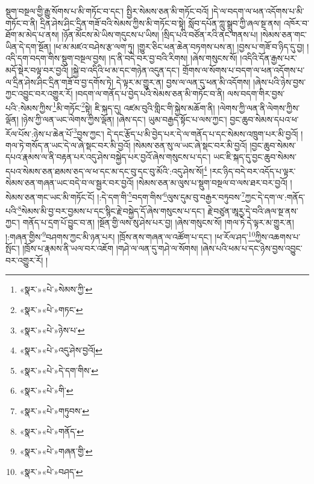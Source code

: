 སྡུག་བསྔལ་གྱི་རྒྱུ་སོགས་པ་མི་གཏོང་བ་དང་། སྤྱིར་སེམས་ཅན་མི་གཏོང་བའོ། །དེ་ལ་བདག་ལ་ཕན་འདོགས་པ་མི་གཏོང་བ་ནི། དྲིན་ཤེས་ཤིང་དྲིན་གཟོ་བའི་སེམས་ཀྱིས་མི་གཏོང་བ་སྟེ། སློབ་དཔོན་ཀླུ་སྒྲུབ་ཀྱི་ཞལ་སྔ་ནས། འཁོར་བ་ཐོག་མ་མེད་པ་ནས། །ཉོན་མོངས་མེ་ཡིས་གདུངས་པ་ཡིས། །སྲིད་པའི་བཙོན་རའི་ནང་གནས་པ། །སེམས་ཅན་གང་ཡིན་དེ་དག་སྔོན། །ཕ་མ་མཛའ་བཤེས་རྩ་ལག་ཏུ། །གྱུར་ཅིང་ཕན་ཆེན་བཏགས་པས་ན། །བྱས་པ་གཟོ་བ་ཉིད་དུ་བྱ། །འདི་དག་བདག་གིས་སྡུག་བསྔལ་བྱས། །ད་ནི་བདེ་བར་བྱ་བའི་རིགས། །ཞེས་གསུངས་སོ། །འདིའི་དོན་རྒྱས་པར་མདོ་སྡེར་བལྟ་བར་བྱའོ། །སྐྱེ་བ་འདིའི་ཕ་མ་དང་གཉེན་འདུན་དང་། གྲོགས་ལ་སོགས་པ་བདག་ལ་ཕན་འདོགས་པ་ལ་དྲིན་ཤེས་ཤིང་དྲིན་གཟོ་བ་བྱ་དགོས་ཏེ། དེ་ལྟར་མ་གྱུར་ན། བྱས་ལ་ལན་དུ་ཕན་མི་འདོགས། །ཞེས་པའི་ཉེས་བྱས་ཀྱང་འབྱུང་བར་འགྱུར་རོ། །བདག་ལ་གནོད་པ་བྱེད་པའི་སེམས་ཅན་མི་གཏོང་བ་ནི། ལས་བདག་གིར་བྱས་པའི་:སེམས་ཀྱིས་\footnote{«སྣར་»«པེ་»སེམས་ཀྱི་}མི་གཏོང་\footnote{«སྣར་»«པེ་»གཏང་}སྟེ། ཇི་སྐད་དུ། འཛམ་བུའི་གླིང་གི་སྐྱེས་མཆོག་ནི། །ལེགས་ཀྱི་ལན་ནི་ལེགས་ཀྱིས་ལྡོན། །ཉེས་ཀྱི་ལན་ཡང་ལེགས་ཀྱིས་ལྡོན། །ཞེས་དང་། ཡུམ་བརྒྱད་སྟོང་པ་ལས་ཀྱང་། བྱང་ཆུབ་སེམས་དཔའ་ཕ་རོལ་པོས་:ཉེས་པ་ཆེན་པོ་\footnote{«སྣར་»«པེ་»ཉེས་པ་}བྱས་ཀྱང་། དེ་དང་རྩོད་པ་མི་བྱེད་པར་དེ་ལ་གནོད་པ་དང་སེམས་འཁྲུག་པར་མི་བྱའོ། །གལ་ཏེ་གསོད་ན་ཡང་དེ་ལ་ཞེ་སྡང་བར་མི་བྱའོ། །སེམས་ཅན་སུ་ལ་ཡང་ཞེ་སྡང་བར་མི་བྱའོ། །བྱང་ཆུབ་སེམས་དཔའ་རྣམས་ལ་ནི་བརྟན་པར་འདུ་ཤེས་བསྐྱེད་པར་བྱའོ་ཞེས་གསུངས་པ་དང་། ཡང་ཇི་སྐད་དུ་བྱང་ཆུབ་སེམས་དཔའ་སེམས་ཅན་ཐམས་ཅད་ལ་ཕ་དང་མ་དང་བུ་དང་བུ་མོའི་:འདུ་ཤེས་སོ།\footnote{«སྣར་»«པེ་»འདུ་ཤེས་བྱའོ།} །རང་ཉིད་བདེ་བར་འདོད་པ་ལྟར་སེམས་ཅན་གཞན་ཡང་བདེ་བ་ལ་སྦྱར་བར་བྱའོ། །སེམས་ཅན་མ་ལུས་པ་སྡུག་བསྔལ་བ་ལས་ཐར་བར་བྱའོ། །སེམས་ཅན་གང་ཡང་མི་གཏོང་ངོ། །:དེ་དག་གི་\footnote{«སྣར་»«པེ་»དེ་དག་གིས་}བདག་གིས་\footnote{«སྣར་»«པེ་»གི་}ལུས་དུམ་བུ་བརྒྱར་བཏུབས་\footnote{«སྣར་»«པེ་»གཏུབས་}ཀྱང་དེ་དག་ལ་:གནོད་པའི་\footnote{«སྣར་»«པེ་»གནོད་}སེམས་མི་བྱ་བར་བྱམས་པ་དང་སྙིང་རྗེ་བསྐྱེད་དོ་ཞེས་གསུངས་པ་དང་། རྗེ་བཙུན་ཨཱརྱ་དེ་བའི་ཞལ་སྔ་ནས་ཀྱང་། གནོད་པ་དྲག་པོ་བྱུང་བ་ན། །སྔོན་གྱི་ལས་སུ་ཤེས་པར་བྱ། །ཞེས་གསུངས་སོ། །གལ་ཏེ་དེ་ལྟར་མ་གྱུར་ན། །:གཞན་གྱིས་\footnote{«སྣར་»«པེ་»གཞན་གྱི་}བཤགས་ཀྱང་མི་ཉན་པར། །ཁྲོས་ནས་གཞན་ལ་འཚོག་པ་དང་། །ཕ་རོལ་ཤད་\footnote{«སྣར་»«པེ་»བཤད་}ཀྱིས་འཆགས་པ་སྤོང་། །ཁྲོས་པ་རྣམས་ནི་ཡལ་བར་འཇོག །གཤེ་ལ་ལན་དུ་གཤེ་ལ་སོགས། །ཞེས་པའི་ཕམ་པ་དང་ཉེས་བྱས་འབྱུང་བར་འགྱུར་རོ། །

